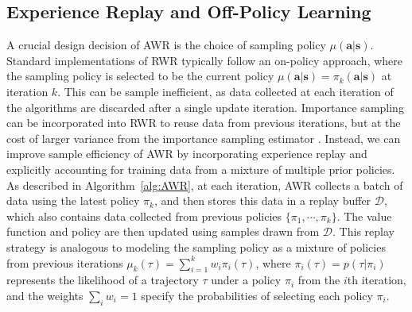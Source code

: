 \documentclass{article} \usepackage{iclr2020_conference,times}
\def\rva{{\mathbf{a}}}
\def\rvs{{\mathbf{s}}}
\newcommand{\weighti}{w_i}
\begin{document}
\subsection{Experience Replay and Off-Policy Learning}
\label{sec:ReplayDerivation}

A crucial design decision of AWR is the choice of sampling policy $\mu(\rva | \rvs)$. Standard implementations of RWR typically follow an on-policy approach, where the sampling policy is selected to be the current policy $\mu(\rva | \rvs) = \pi_k(\rva | \rvs)$ at iteration $k$. This can be sample inefficient, as data collected at each iteration of the algorithms are discarded after a single update iteration. Importance sampling can be incorporated into RWR to reuse data from previous iterations, but at the cost of larger variance from the importance sampling estimator \citep{POWER2008}. Instead, we can improve sample efficiency of AWR by incorporating experience replay and explicitly accounting for training data from a mixture of multiple prior policies.
As described in Algorithm~\ref{alg:AWR}, at each iteration, AWR collects a batch of data using the latest policy $\pi_k$, and then stores this data in a replay buffer $\mathcal{D}$, which also contains data collected from previous policies $\{\pi_1, \cdots, \pi_k\}$. The value function and policy are then updated using samples drawn from $\mathcal{D}$. This replay strategy is analogous to modeling the sampling policy as a mixture of policies from previous iterations ${\mu_k(\tau) = \sum_{i = 1}^k \weighti \pi_i(\tau)}$, where $\pi_i(\tau) = p(\tau | \pi_i)$ represents the likelihood of a trajectory $\tau$ under a policy $\pi_i$ from the $i$th iteration, and the weights $\sum_i \weighti = 1$ specify the probabilities of selecting each policy $\pi_i$.
\end{document}
